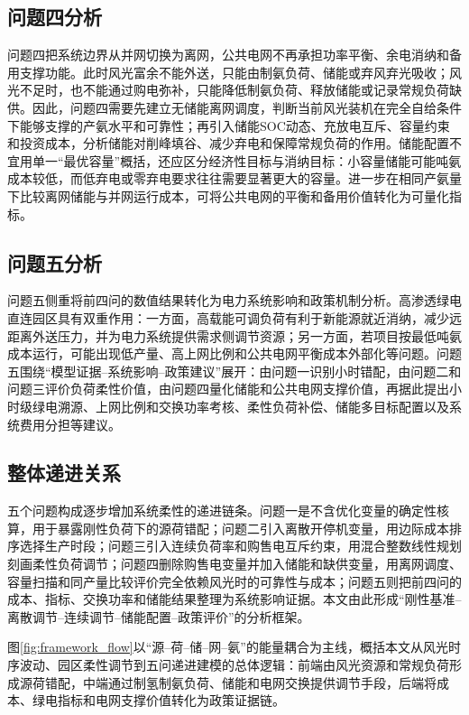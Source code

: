 \documentclass[UTF8,a4paper,12pt]{ctexart}
\begin{document}
\subsection{问题四分析}

问题四把系统边界从并网切换为离网，公共电网不再承担功率平衡、余电消纳和备用支撑功能。此时风光富余不能外送，只能由制氨负荷、储能或弃风弃光吸收；风光不足时，也不能通过购电弥补，只能降低制氨负荷、释放储能或记录常规负荷缺供。因此，问题四需要先建立无储能离网调度，判断当前风光装机在完全自给条件下能够支撑的产氨水平和可靠性；再引入储能SOC动态、充放电互斥、容量约束和投资成本，分析储能对削峰填谷、减少弃电和保障常规负荷的作用。储能配置不宜用单一“最优容量”概括，还应区分经济性目标与消纳目标：小容量储能可能吨氨成本较低，而低弃电或零弃电要求往往需要显著更大的容量。进一步在相同产氨量下比较离网储能与并网运行成本，可将公共电网的平衡和备用价值转化为可量化指标。

\subsection{问题五分析}

问题五侧重将前四问的数值结果转化为电力系统影响和政策机制分析。高渗透绿电直连园区具有双重作用：一方面，高载能可调负荷有利于新能源就近消纳，减少远距离外送压力，并为电力系统提供需求侧调节资源；另一方面，若项目按最低吨氨成本运行，可能出现低产量、高上网比例和公共电网平衡成本外部化等问题。问题五围绕“模型证据--系统影响--政策建议”展开：由问题一识别小时错配，由问题二和问题三评价负荷柔性价值，由问题四量化储能和公共电网支撑价值，再据此提出小时级绿电溯源、上网比例和交换功率考核、柔性负荷补偿、储能多目标配置以及系统费用分担等建议。

\subsection{整体递进关系}

五个问题构成逐步增加系统柔性的递进链条。问题一是不含优化变量的确定性核算，用于暴露刚性负荷下的源荷错配；问题二引入离散开停机变量，用边际成本排序选择生产时段；问题三引入连续负荷率和购售电互斥约束，用混合整数线性规划刻画柔性负荷调节；问题四删除购售电变量并加入储能和缺供变量，用离网调度、容量扫描和同产量比较评价完全依赖风光时的可靠性与成本；问题五则把前四问的成本、指标、交换功率和储能结果整理为系统影响证据。本文由此形成“刚性基准--离散调节--连续调节--储能配置--政策评价”的分析框架。

图\ref{fig:framework_flow}以“源--荷--储--网--氨”的能量耦合为主线，概括本文从风光时序波动、园区柔性调节到五问递进建模的总体逻辑：前端由风光资源和常规负荷形成源荷错配，中端通过制氢制氨负荷、储能和电网交换提供调节手段，后端将成本、绿电指标和电网支撑价值转化为政策证据链。
\end{document}
